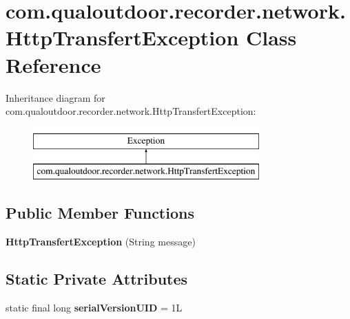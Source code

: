 \hypertarget{classcom_1_1qualoutdoor_1_1recorder_1_1network_1_1HttpTransfertException}{\section{com.\-qualoutdoor.\-recorder.\-network.\-Http\-Transfert\-Exception Class Reference}
\label{classcom_1_1qualoutdoor_1_1recorder_1_1network_1_1HttpTransfertException}
}
Inheritance diagram for com.\-qualoutdoor.\-recorder.\-network.\-Http\-Transfert\-Exception\-:\begin{figure}[H]
\begin{center}
\leavevmode
\includegraphics[height=2.000000cm]{classcom_1_1qualoutdoor_1_1recorder_1_1network_1_1HttpTransfertException}
\end{center}
\end{figure}
\subsection*{Public Member Functions}
\begin{DoxyCompactItemize}
\item 
\hypertarget{classcom_1_1qualoutdoor_1_1recorder_1_1network_1_1HttpTransfertException_a8e66d214d906e1a3f14b41892aa6cc71}{{\bfseries Http\-Transfert\-Exception} (String message)}\label{classcom_1_1qualoutdoor_1_1recorder_1_1network_1_1HttpTransfertException_a8e66d214d906e1a3f14b41892aa6cc71}

\end{DoxyCompactItemize}
\subsection*{Static Private Attributes}
\begin{DoxyCompactItemize}
\item 
\hypertarget{classcom_1_1qualoutdoor_1_1recorder_1_1network_1_1HttpTransfertException_ae55153b73cbb539030f76a09bfb6a395}{static final long {\bfseries serial\-Version\-U\-I\-D} = 1\-L}\label{classcom_1_1qualoutdoor_1_1recorder_1_1network_1_1HttpTransfertException_ae55153b73cbb539030f76a09bfb6a395}

\end{DoxyCompactItemize}


